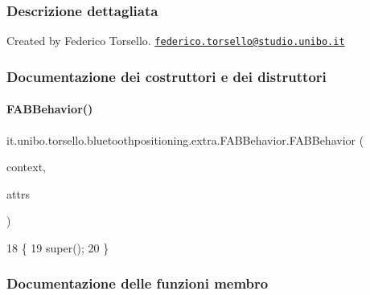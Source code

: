 \subsubsection{Descrizione dettagliata}
Created by Federico Torsello. \href{mailto:federico.torsello@studio.unibo.it}{\tt federico.\+torsello@studio.\+unibo.\+it} 

\subsubsection{Documentazione dei costruttori e dei distruttori}
\hypertarget{classit_1_1unibo_1_1torsello_1_1bluetoothpositioning_1_1extra_1_1FABBehavior_ae703e3a3d6d647561f7b41a0eb94a9f0_ae703e3a3d6d647561f7b41a0eb94a9f0}{}\label{classit_1_1unibo_1_1torsello_1_1bluetoothpositioning_1_1extra_1_1FABBehavior_ae703e3a3d6d647561f7b41a0eb94a9f0_ae703e3a3d6d647561f7b41a0eb94a9f0} 
\paragraph{\texorpdfstring{F\+A\+B\+Behavior()}{FABBehavior()}}
{\footnotesize\ttfamily it.\+unibo.\+torsello.\+bluetoothpositioning.\+extra.\+F\+A\+B\+Behavior.\+F\+A\+B\+Behavior (\begin{DoxyParamCaption}\item[{Context}]{context,  }\item[{Attribute\+Set}]{attrs }\end{DoxyParamCaption})}


\begin{DoxyCode}
18                                                             \{
19         super();
20     \}
\end{DoxyCode}


\subsubsection{Documentazione delle funzioni membro}
\hypertarget{classit_1_1unibo_1_1torsello_1_1bluetoothpositioning_1_1extra_1_1FABBehavior_ab4208eb2a50a8e79e0a80089f398a5b9_ab4208eb2a50a8e79e0a80089f398a5b9}{}\label{classit_1_1unibo_1_1torsello_1_1bluetoothpositioning_1_1extra_1_1FABBehavior_ab4208eb2a50a8e79e0a80089f398a5b9_ab4208eb2a50a8e79e0a80089f398a5b9} 
